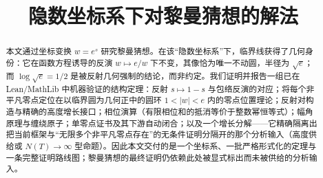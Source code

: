 \begin{frontmatter}

\title{隐数坐标系下对黎曼猜想的解法}

\begin{aug}


\end{aug}

\begin{abstract}
本文通过坐标变换 $w=e^{s}$ 研究黎曼猜想。在该“隐数坐标系”下，临界线获得了几何身份：它在函数方程诱导的反演 $w\mapsto e/w$ 下不变，其像恰为唯一不动圆，半径为 $\sqrt{e}$；而 $\log\sqrt{e}=1/2$ 是被反射几何强制的结论，而非约定。我们证明并报告一组已在 Lean/MathLib 中机器验证的结构定理：反射 $s\mapsto 1-s$ 与包络反演的对应；将每个非平凡零点定位在以临界圆为几何正中的圆环 $1<|w|<e$ 内的零点位置理论；反射对构造与精确的高度增长接口；相位演算（有限相位和的抵消等价于整数幂恒等式）；幅角原理与缠绕原子；单零点证书及其下游自动闭合；以及一个增长分解——它精确隔离出把当前框架与“无限多个非平凡零点存在”的无条件证明分隔开的那个分析输入（高度供给或 $N(T)\to\infty$ 型命题）。因此本文交付的是一个坐标系、一批严格形式化的定理与一条完整证明路线图；黎曼猜想的最终证明仍依赖此处被显式标出而未被供给的分析输入。
\end{abstract}


\begin{keywords}
\end{keywords}


\end{frontmatter}
